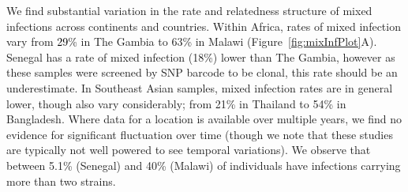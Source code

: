 \documentclass[9pt,lineno]{elife}
\begin{document}
\begin{table}[btp]
\end{table}



We find substantial variation in the rate and relatedness structure of mixed infections across continents and countries.  Within Africa, rates of mixed infection vary from \textcolor{black}{29}\% in The Gambia to 63\% in Malawi (Figure~\ref{fig:mixInfPlot}A). Senegal has a rate of mixed infection (18\%) lower than The Gambia, however as these samples were screened by SNP barcode to be clonal, this rate should be an underestimate.  In Southeast Asian samples, mixed infection rates are in general lower, though also vary considerably; from 21\% in Thailand to 54\% in Bangladesh.  Where data for a location is available over multiple years, we find no evidence for significant fluctuation over time (though we note that these studies are typically not well powered to see temporal variations). We observe that between 5.1\% (Senegal) and 40\% (Malawi) of individuals have infections carrying more than two strains.
\end{document}
